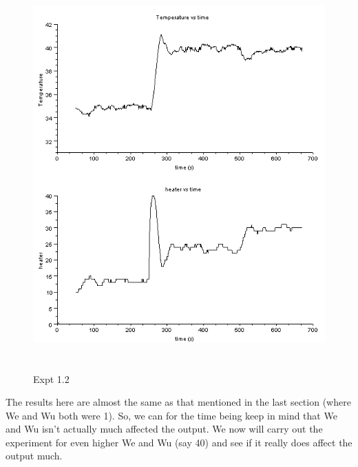\begin{figure}[H]
  \includegraphics[width=12cm, height=15cm]{mpc/1_2_heater_final.png}
  \caption{ Expt 1.2}
\end{figure}
The results here are almost the same as that mentioned in the last section (where We and Wu both were 1). So, we can for the time being keep in mind that We and Wu isn't actually much affected the output. We now will carry out the experiment for even higher We and Wu (say 40) and see if it really does affect the output much.


